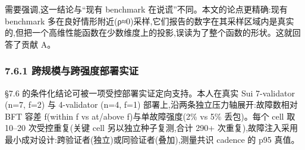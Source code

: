 \documentclass[UTF8,fontset=windows,a4paper,11pt]{ctexart}
\begin{document}
需要强调,这一结论与``现有 benchmark 在说谎''不同。本文的论点更精确:现有
benchmark
多在良好情形附近(ρ≈0)采样,它们报告的数字在其采样区域内是真实的,但把一个高维性能函数在少数维度上的投影,误读为了整个函数的形状。这就回答了贡献
A。

\subsubsection{7.6.1
跨规模与跨强度部署实证}\label{ux8de8ux89c4ux6a21ux4e0eux8de8ux5f3aux5ea6ux90e8ux7f72ux5b9eux8bc1}

§7.6 的条件化结论可被一项受控部署实证定向支持。本人在真实 Sui
7-validator (n=7, f=2) 与 4-validator (n=4, f=1)
部署上,沿两条独立压力轴展开:故障数相对 BFT 容差 f(within f vs at/above
f)与单故障强度(2\% vs 5\% 丢包)。每个 cell 取 10--20 次受控重复(关键
cell 另以独立种子复测,合计 290+
次重复),故障注入采用最小成对设计:跨验证者(独立)或同验证者(叠加),测量共识
cadence 的 p95 真值。
\end{document}
